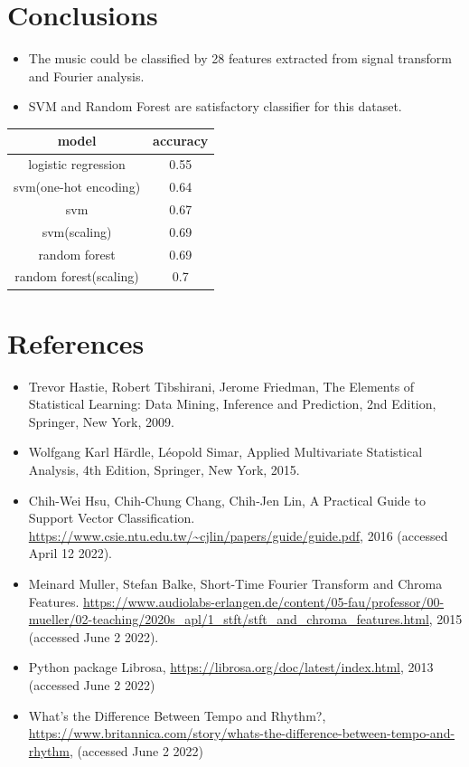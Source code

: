 \documentclass[12pt,a4paper]{article}
\begin{document}
\newpage
\section{Conclusions}
\begin{itemize}
  \item The music could be classified by 28 features extracted from signal transform and Fourier analysis.
  \item SVM and Random Forest are satisfactory classifier for this dataset.
\end{itemize}

\begin{center}
\begin{tabular}{ |c|c| } 
\hline
 model & accuracy \\ 
\hline
 logistic regression & 0.55 \\ 
 \hline\hline
 svm(one-hot encoding) & 0.64 \\ 
 \hline
 svm & 0.67 \\ 
 \hline
 svm(scaling) & 0.69 \\ 
 \hline\hline
 random forest & 0.69 \\ 
 \hline
 random forest(scaling) & 0.7 \\ 
 \hline
\end{tabular}
\end{center}

\newpage

\section*{References}
\begin{itemize}
  \item Trevor Hastie, Robert Tibshirani, Jerome Friedman, The Elements of Statistical Learning: Data Mining, Inference and Prediction, 2nd Edition, Springer, New York, 2009.
  \item Wolfgang Karl Härdle, Léopold Simar,  Applied Multivariate Statistical Analysis, 4th Edition, Springer, New York, 2015.
  \item Chih-Wei Hsu, Chih-Chung Chang, Chih-Jen Lin, A Practical Guide to Support Vector Classification. \url{https://www.csie.ntu.edu.tw/~cjlin/papers/guide/guide.pdf}, 2016 (accessed April 12 2022).
  \item Meinard Muller, Stefan Balke, Short-Time Fourier Transform and Chroma Features. \url{https://www.audiolabs-erlangen.de/content/05-fau/professor/00-mueller/02-teaching/2020s_apl/1_stft/stft_and_chroma_features.html}, 2015 (accessed June 2 2022).
  \item Python package Librosa, \url{https://librosa.org/doc/latest/index.html}, 2013 (accessed June 2 2022)
  \item What's the Difference Between Tempo and Rhythm?, \url{https://www.britannica.com/story/whats-the-difference-between-tempo-and-rhythm}, (accessed June 2 2022)
\end{itemize}
\end{document}
